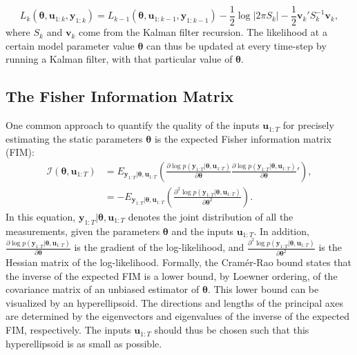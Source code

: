 \begin{equation}
L_k(\bm \theta, \bm u_{1:k}, \bm y_{1:k}) = L_{k-1}(\bm \theta, \bm u_{1:k-1}, \bm y_{1:k-1})
-\frac{1}{2}\log\left|2\pi S_k\right| -\frac{1}{2}\bm v_{k}' S_{k}^{-1}\bm v_{k},
\label{log likelihood}
\end{equation}
where $S_k$ and $\bm v_k$ come from the Kalman filter recursion. The likelihood at a certain model parameter value $\bm \theta$ can thus be updated at every time-step by running a Kalman filter, with that particular value of $\bm \theta$.
\subsection{The Fisher Information Matrix}
\label{secFIM3}
One common approach to quantify the quality of the inputs $\bm u_{1:T}$ for precisely estimating the static parameters $\bm \theta$ is the expected Fisher information matrix (FIM):
\begin{equation}
\begin{aligned}
\mathcal{I}(\bm \theta,\bm u_{1:T}) &= 
E_{\bm y_{1:T}|\bm \theta, \bm u_{1:T}} \left ( \frac{\partial \log p(\bm y_{1:T}|\bm \theta, \bm u_{1:T})}{\partial \bm \theta}
\frac{\partial \log p(\bm y_{1:T}|\bm \theta, \bm u_{1:T})}{\partial \bm \theta}' \right ),\\
&= -E_{\bm y_{1:T}|\bm \theta,\bm u_{1:T}}\left(\frac{\partial^2 \log p(\bm y_{1:T}|\bm \theta, \bm u_{1:T})}{\partial \bm \theta^2}\right).
\end{aligned}
\label{expectedFIM}
\end{equation}
In this equation, $\bm y_{1:T}|\bm \theta, \bm u_{1:T}$ denotes the joint distribution of all the measurements, given the parameters $\bm \theta$ and the inputs $\bm u_{1:T}$. In addition, $\frac{\partial \log p(\bm y_{1:T}|\bm \theta, \bm u_{1:T})}{\partial \bm \theta}$ is the gradient of the log-likelihood, and $\frac{\partial^2 \log p(\bm y_{1:T}|\bm \theta, \bm u_{1:T})}{\partial \bm \theta^2}$ is the Hessian matrix of the log-likelihood. Formally, the Cramér-Rao bound states that the inverse of the expected FIM is a lower bound, by Loewner ordering, of the covariance matrix of an unbiased estimator of $\bm \theta$. This lower bound can be visualized by an hyperellipsoid. The directions and lengths of the principal axes are determined by the eigenvectors and eigenvalues of the inverse of the expected FIM, respectively. The inputs $\bm u_{1:T}$ should thus be chosen such that this hyperellipsoid is as small as possible.
\\
